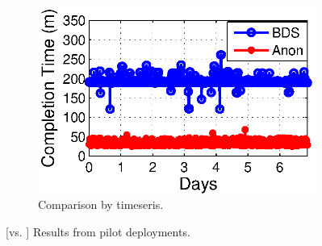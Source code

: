 \begin{figure}[t]
\begin{subfigure}[b]{0.3\textwidth}
                \includegraphics[width=\textwidth]{images/BDSvsAnon_time.eps}
                \caption{Comparison by timeseris.}
                \label{fig:BDSvsAnon:time}
        \end{subfigure}
        \caption{[\name vs. \company] Results from pilot deployments.}
        \label{fig:BDSvsAnon}
\vspace{-0.4cm}
\end{figure}
